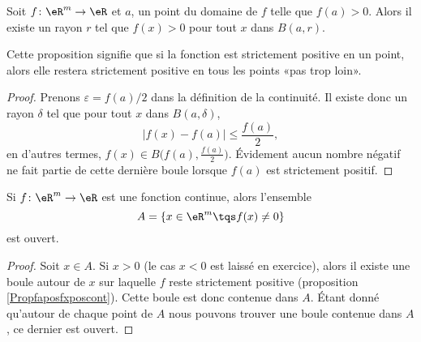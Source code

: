 \begin{proposition}		\label{Propfaposfxposcont}
	Soit $f\colon \eR^m\to \eR$ et $a$, un point du domaine de $f$ telle que $f(a)>0$. Alors il existe un rayon $r$ tel que $f(x)>0$ pour tout $x$ dans $B(a,r)$.
\end{proposition}
Cette proposition signifie que si la fonction est strictement positive en un point, alors elle restera strictement positive en tous les points «pas trop loin».

\begin{proof}
	Prenons $\varepsilon=f(a)/2$ dans la définition de la continuité. Il existe donc un rayon $\delta$ tel que pour tout $x$ dans $B(a,\delta)$,
	\begin{equation}
		| f(x)-f(a) |\leq \frac{ f(a) }{2},
	\end{equation}
	en d'autres termes, $f(x)\in B\big( f(a),\frac{ f(a) }{ 2 } \big)$. Évidement aucun nombre négatif ne fait partie de cette dernière boule lorsque $f(a)$ est strictement positif.
\end{proof}

\begin{corollary}		\label{CorfneqzOuvert}
	Si $f\colon \eR^m\to \eR$ est une fonction continue, alors l'ensemble
	\begin{equation}
		A=\{ x\in\eR^m\tqs f(x)\neq 0 \}
	\end{equation}
	est ouvert.
\end{corollary}

\begin{proof}
	Soit $x\in A$. Si $x>0$ (le cas $x<0$ est laissé en exercice), alors il existe une boule autour de $x$ sur laquelle $f$ reste strictement positive (proposition \ref{Propfaposfxposcont}). Cette boule est donc contenue dans $A$. Étant donné qu'autour de chaque point de $A$ nous pouvons trouver une boule contenue dans $A$, ce dernier est ouvert.
\end{proof}

